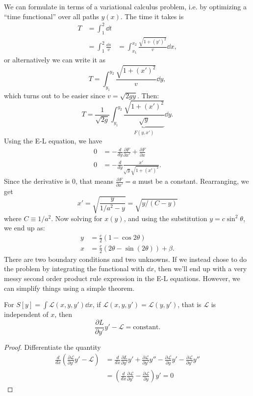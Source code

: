 \documentclass{article}
\numberwithin{equation}{section}
\begin{document}
We can formulate in terms of a variational calculus problem, i.e. by optimizing a ``time functional'' over all paths $y(x)$. The time it takes is 
\begin{align*}
    T &= \int_1^2 \dd{t} \\ 
    &= \int_1^2 \frac{\dd{s}}{v}
    &= \int_{x_1}^{x_2} \frac{\sqrt{1+(y')^2}}{v}\dd{x},
\end{align*}
or alternatively we can write it as 
\begin{equation}
    T = \int_{y_1}^{y_2} \frac{\sqrt{1+(x')^2}}{v} \dd{y},
\end{equation}
which turns out to be easier since $v=\sqrt{2gy}$. Then:
\begin{equation}
    T = \frac{1}{\sqrt{2g}} \int_{y_1}^{y_2} \underbrace{\frac{\sqrt{1+(x')^2}}{\sqrt{y}}}_{F(y,x')} \dd{y}.
\end{equation}
Using the E-L equation, we have
\begin{align*}
    0 &= -\frac{d}{dy} \frac{\partial F}{\partial x'} + \frac{\partial F}{\partial x} \\ 
    0 &= -\frac{d}{dy} \frac{x'}{\sqrt{y}\sqrt{1+(x')^2}}.
\end{align*}
Since the derivative is $0$, that means $\frac{\partial F}{\partial x'}=a$ must be a constant. Rearranging, we get
\begin{equation}
    x' = \sqrt{\frac{y}{1/a^2-y}} = \sqrt{y/(C-y)}
\end{equation}
where $C\equiv 1/a^2.$ Now solving for $x(y)$, and using the substitution $y=c\sin^2\theta$, we end up as:
\begin{align}
    y &= \frac{c}{2}(1-\cos 2\theta) \\ 
    x &= \frac{c}{2}(2\theta-\sin(2\theta)) + \beta.
\end{align}
There are two boundary conditions and two unknowns. If we instead chose to do the problem by integrating the functional with $\dd{x}$, then we'll end up with a very messy second order product rule expression in the E-L equations. However, we can simplify things using a simple theorem.
\begin{theorem}
    For $S[y] = \int \mathcal{L}(x,y,y') \dd{x}$, if $\mathcal{L}(x,y,y')=\mathcal{L}(y,y')$, that is $\mathcal{L}$ is independent of $x$, then 
    \begin{equation}
        \frac{\partial L}{\partial y'}y' - \mathcal{L} = \text{constant}.
    \end{equation}
\end{theorem}
\begin{proof}
    Differentiate the quantity
    \begin{align}
        \frac{d}{dx}\left(\frac{\partial \mathcal{L}}{\partial y'}y'- \mathcal{L}\right) &= \frac{d}{dx}\frac{\partial L}{\partial y'}y' + \frac{\partial \mathcal{L}}{\partial y'}{y''} - \frac{\partial \mathcal{L}}{\partial y}y' - \frac{\partial \mathcal{L}}{\partial y'}y'' \\ 
        &= \left(\frac{d}{dx} \frac{\partial \mathcal{L}}{\partial y'}-\frac{\partial \mathcal{L}}{\partial y}\right)y' = 0 
    \end{align}
\end{proof}
\end{document}
